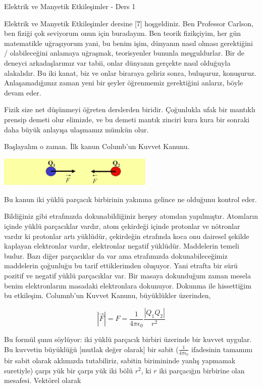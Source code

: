 \documentclass[12pt,fleqn]{article}\usepackage{../../common}
\begin{document}
Elektrik ve Manyetik Etkileşimler - Ders 1

Elektrik ve Manyetik Etkileşimler dersine [7] hoşgeldiniz. Ben Professor
Carlson, ben fiziği çok seviyorum onun için buradayım. Ben teorik fizikçiyim,
her gün matematikle uğraşıyorum yani, bu benim işim, dünyanın nasıl olması
gerektiğini / olabileceğini anlamaya uğraşmak, teorisyenler bununla
meşguldurlar. Bir de deneyci arkadaşlarımız var tabii, onlar dünyanın gerçekte
nasıl olduğuyla alakalıdır. Bu iki kanat, biz ve onlar biraraya geliriz sonra,
buluşuruz, konuşuruz. Anlaşamadığımız zaman yeni bir şeyler öğrenmemiz
gerektiğini anlarız, böyle devam eder.

Fizik size net düşünmeyi öğreten derslerden biridir. Çoğunlukla ufak bir
mantıklı prensip demeti olur elimizde, ve bu demeti mantık zinciri kura
kura bir sonraki daha büyük anlayışa ulaşmamız mümkün olur. 

Başlayalım o zaman. İlk kanun Columb'un Kuvvet Kanunu.

\includegraphics[width=20em]{elecmag_01.png} 

Bu kanun iki yüklü parçacık birbirinin yakınına gelince ne olduğunu
kontrol eder. 

Bildiğiniz gibi etrafınızda dokunabildiğiniz herşey atomdan
yapılmıştır. Atomların içinde yüklü parçacıklar vardır, atom çekirdeği
içinde protonlar ve nötronlar vardır ki protonlar artı yüklüdür, çekirdeğin
etrafında koca onu dairesel şekilde kaplayan elektronlar vardır,
elektronlar negatif yüklüdür. Maddelerin temeli budur. Bazı diğer
parçacıklar da var ama etrafımızda dokunabileceğimiz maddelerin çoğunluğu
bu tarif ettiklerimden oluşuyor. Yani etrafta bir sürü pozitif ve negatif
yüklü parçacıklar var. Bir masaya dokunduğum zaman mesela benim
elektronlarım masadaki elektronlara dokunuyor. Dokunma ile hissettiğim bu
etkileşim. Columnb'un Kuvvet Kanunu, büyüklükler üzerinden,

$$ 
|\vec{F}|  = F = \frac{1}{4\pi \epsilon_0} \frac{|Q_1 Q_2|}{r^2}
$$

Bu formül şunu söylüyor: iki yüklü parçacık birbiri üzerinde bir kuvvet
uygular. Bu kuvvetin büyüklüğü [mutlak değer olarak] bir sabit
($\frac{1}{4\pi \epsilon_0} $ ifadesinin tamamını bir sabit olarak
aklımızda tutabiliriz, sabitin birimininde yanlış yapmamak suretiyle) çarpı
yük bir çarpı yük iki bölü $r^2$, ki $r$ iki parçacığın birbirine olan
mesafesi. Vektörel olarak
\end{document}
